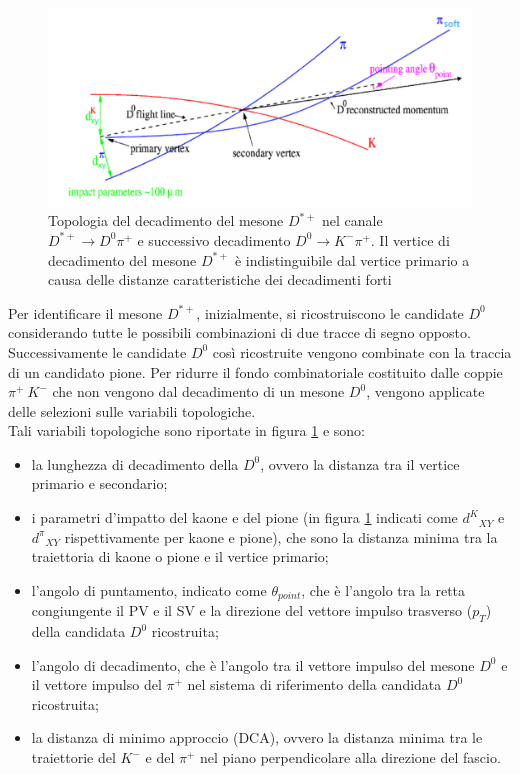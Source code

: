     \begin{figure}[htbp]
        \centering
        \includegraphics[width=0.9\linewidth]{introParticelle/DecadimentoDStar.png}
        \caption{Topologia del decadimento del mesone $D^{*+}$ nel canale $D^{*+} \rightarrow D^0 \pi^+$ e successivo decadimento $D^0 \rightarrow K^- \pi^+$. Il vertice di decadimento del mesone $D^{*+}$ \`e indistinguibile dal vertice primario a causa delle distanze caratteristiche dei decadimenti forti}
        \label{fig:decadimentoD}
    \end{figure}
    
Per identificare il mesone $D^{*+}$, inizialmente, si ricostruiscono le candidate $D^0$ considerando tutte le possibili combinazioni di due tracce di segno opposto. Successivamente le candidate $D^0$ cos\`i ricostruite vengono combinate con la traccia di un candidato pione. Per ridurre il fondo combinatoriale costituito dalle coppie $\pi^+ \ K^-$ che non vengono dal decadimento di un mesone $D^0$, vengono applicate delle selezioni sulle variabili topologiche.
\\Tali variabili topologiche sono riportate in figura \ref{fig:decadimentoD} e sono:
    \begin{itemize}
        \item la lunghezza di decadimento della $D^0$, ovvero la distanza tra il vertice primario e secondario;
        \item i parametri d'impatto del kaone e del pione (in figura \ref{fig:decadimentoD} indicati come ${d^K}_{XY}$ e ${d^\pi}_{XY}$ rispettivamente per kaone e pione), che sono la distanza minima tra la traiettoria di kaone o pione e il vertice primario;
        \item l'angolo di puntamento, indicato come $\theta_{point}$, che \`e l'angolo tra la retta congiungente il PV e il SV e la direzione del vettore impulso trasverso ($p_T$) della candidata $D^{0}$ ricostruita;
        \item l'angolo di decadimento, che \`e l'angolo tra il vettore impulso del mesone $D^0$ e il vettore impulso del $\pi^+$ nel sistema di riferimento della candidata $D^0$ ricostruita;
        \item la distanza di minimo approccio (DCA), ovvero la distanza minima tra le traiettorie del $K^-$ e del $\pi^+$ nel piano perpendicolare alla direzione del fascio.
    \end{itemize}{}

